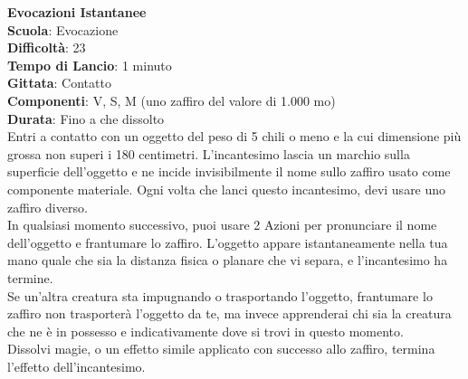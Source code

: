 \begin{multicols}{2}
\medskip\textbf{Evocazioni Istantanee}\\
\textbf{Scuola}: Evocazione\\
\textbf{Difficoltà}: 23\\
\textbf{Tempo di Lancio}: 1 minuto\\
\textbf{Gittata}: Contatto\\
\textbf{Componenti}: V, S, M (uno zaffiro del valore di 1.000 mo)\\
\textbf{Durata}: Fino a che dissolto \\
Entri a contatto con un oggetto del peso di 5 chili o meno e la cui dimensione più grossa non superi i 180 centimetri. L'incantesimo lascia un marchio sulla superficie dell'oggetto e ne incide invisibilmente il nome sullo zaffiro usato come componente materiale. Ogni volta che lanci questo incantesimo, devi usare uno zaffiro diverso.\\
In qualsiasi momento successivo, puoi usare 2 Azioni per pronunciare il nome dell'oggetto e frantumare lo zaffiro. L'oggetto appare istantaneamente nella tua mano quale che sia la distanza fisica o planare che vi separa, e l'incantesimo ha termine.\\
Se un'altra creatura sta impugnando o trasportando l'oggetto, frantumare lo zaffiro non trasporterà l'oggetto da te, ma invece apprenderai chi sia la creatura che ne è in possesso e indicativamente dove si trovi in questo momento.\\
Dissolvi magie, o un effetto simile applicato con successo allo zaffiro, termina l'effetto dell'incantesimo. 


\end{multicols}
